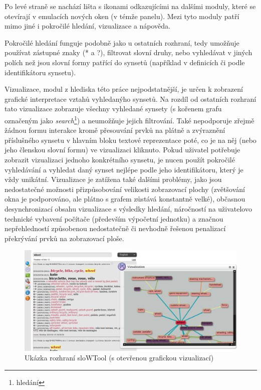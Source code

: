 \documentclass[a4paper, 11pt, oneside]{book}
\newcommand\ex{\textsf}
\begin{document}
				Po levé straně se nachází lišta s ikonami odkazujícími na dalšími moduly, které se otevírají v emulacích nových oken (v témže panelu). Mezi tyto moduly patří mimo jiné i pokročilé hledání, vizualizace a nápověda. 

				Pokročilé hledání funguje podobně jako u ostatních rozhraní, tedy umožňuje používat zástupné znaky (\ex{*} a \ex{?}), filtrovat slovní druhy, nebo vyhledávat v jiných polích než jsou slovní formy patřící do synsetů (například v definicích či podle identifikátoru synsetu). 

				Vizualizace, modul z hlediska této práce nejpodstatnější, je určen k zobrazení grafické interpretace vztahů vyhledanýho synsetů. Na rozdíl od ostatních rozhraní tato vizualizace zobrazuje všechny vyhledané synsety (s kořenem grafu označeným jako \textit{search}\footnote{hledání}) a neumožňuje jejich filtrování. Také nepodporuje zřejmě žádnou formu interakce kromě přesouvání prvků na plátně a zvýraznění příslušného synsetu v hlavním bloku textové reprezentace poté, co je na něj (nebo jeho členskou slovní formu) ve vizualizaci kliknuto. Pokud uživatel potřebuje zobrazit vizualizaci jednoho konkrétního synsetu, je nucen použít pokročilé vyhledávání a vyhledat daný synset nejlépe podle jeho identifikátoru, který je vždy unikátní. Vizualizace je zatížena také dalšími problémy, jako jsou nedostatečné možnosti přizpůsobování velikosti zobrazovací plochy (zvětšování okna je podporováno, ale plátno s grafem zůstává konstantně velké), občasnou desynchronizací obsahu vizualizace s výsledky hledání, náročností na uživatelovo technické vybavení počítače (především výpočetní jednotku) a značnou nepřehledností způsobenou nedostatečně či nevhodně řešenou penalizací překrývání prvků na zobrazovací ploše. 

				\begin{figure}[h]
					\centering
					\includegraphics[width=1.0\textwidth]{slowtool.png}
					\caption{Ukázka rozhraní sloWTool (s otevřenou grafickou vizualizací)}
					\label{fig:slowtool}
				\end{figure}
\end{document}
